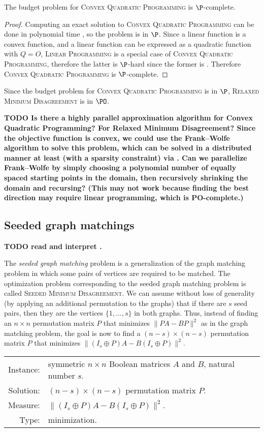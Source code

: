 \documentclass{article}
\newcommand{\todo}[1]{\textbf{TODO #1}}
\newcommand{\1}{\mathbf{1}}
\newcommand{\RMD}{\textsc{Relaxed Minimum Disagreement}}
\newcommand{\CQP}{\textsc{Convex Quadratic Programming}}
\newcommand{\SMD}{\textsc{Seeded Minimum Disagreement}}
\begin{document}
\begin{theorem}
  The budget problem for \CQP{} is $\P$-complete.
\end{theorem}
\begin{proof}
  Computing an exact solution to \CQP{} can be done in polynomial time \autocite{gl90}, so the problem is in $\P$.
  Since a linear function is a convex function, and a linear function can be expressed as a quadratic function with $Q = O$, \textsc{Linear Programming} is a special case of \CQP{}, therefore the latter is $\P$-hard since the former is \autocite{ghr95}.
  Therefore \CQP{} is $\P$-complete.
\end{proof}

Since the budget problem for \CQP{} is in $\P$, \RMD{} is in $\PO$.

\todo{
  Is there a highly parallel approximation algorithm for Convex Quadratic Programming?
  For Relaxed Minimum Disagreement?
  Since the objective function is convex, we could use the Frank--Wolfe algorithm to solve this problem, which can be solved in a distributed manner at least (with a sparsity constraint) via \autocite{blgbs15}.
  Can we parallelize Frank--Wolfe by simply choosing a polynomial number of equally spaced starting points in the domain, then recursively shrinking the domain and recursing?
  (This may not work because finding the best direction may require linear programming, which is PO-complete.)}

\subsection{Seeded graph matchings}

\todo{read and interpret \autocite{lfp14, l14, lavpp14}.}

The \emph{seeded graph matching} problem is a generalization of the graph matching problem in which some pairs of vertices are required to be matched.
The optimization problem corresponding to the seeded graph matching problem is called \SMD{}.
We can assume without loss of generality (by applying an additional permutation to the graphs) that if there are $s$ seed pairs, then they are the vertices $\{1, \dotsc, s\}$ in both graphs.
Thus, instead of finding an $n \times n$ permutation matrix $P$ that minimizes $\| PA - BP \|^2$ as in the graph matching problem, the goal is now to find a $(n - s) \times (n - s)$ permutation matrix $P$ that minimizes $\| (I_s \oplus P) A - B (I_s \oplus P) \|^2$.

\begin{definition}[\SMD{}]
  \mbox{}

  \begin{tabular}{r p{9.3cm}}
    Instance: & symmetric $n \times n$ Boolean matrices $A$ and $B$, natural number $s$. \\
    Solution: & $(n - s) \times (n - s)$ permutation matrix $P$. \\
    Measure: & $\| (I_s \oplus P) A - B (I_s \oplus P) \|^2$. \\
    Type: & minimization.
  \end{tabular}
\end{definition}
\end{document}
